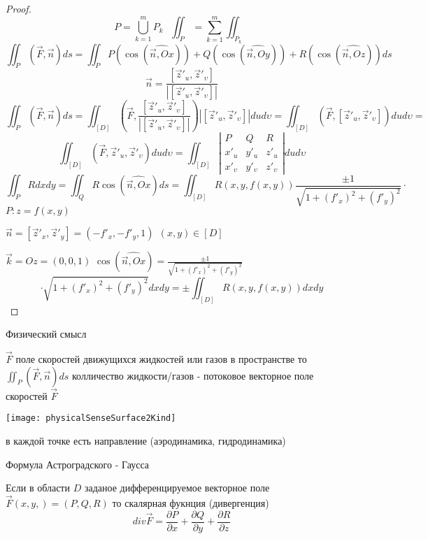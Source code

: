 \begin{proof}
  $$
  P = \bigcup_{k=1}^m P_k ~~~ \iint_P = \sum_{k=1}^m \iint_{P_k}
  $$
  $$
  \iint_P (\vec F, \vec n) ds = \iint_P
  P(\cos(\widehat{\vec n, Ox})) +
  Q(\cos(\widehat{\vec n, Oy})) +
  R(\cos(\widehat{\vec n, Oz}))ds
  $$
  $$
  \vec n = \frac{[\vec z'_u, \vec z'_{\upsilon}]}
  {|[\vec z'_u, \vec z'_{\upsilon}]|}
  $$
  $$
  \iint_P (\vec F, \vec n) ds = \iint_{[D]} \left( \vec F,
  \frac{[\vec z'_u, \vec z'_{\upsilon}]}
  {|[\vec z'_u, \vec z'_{\upsilon}]|} \right) |[\vec z'_u, \vec z'_{\upsilon}]|
  du d\upsilon = \iint_{[D]} (\vec F,[\vec z'_u, \vec z'_{\upsilon}])du
  d\upsilon =
  $$
  $$
  \iint_{[D]} (\vec F, \vec z'_u , \vec z'_{\upsilon}) du d\upsilon
  = \iint_{[D]}
  \left|
  \begin{array}{ccc}
    P & Q & R \\
    x'_u & y'_u & z'_u \\
    x'_{\upsilon} & y'_{\upsilon} & z'_{\upsilon}
  \end{array}
  \right| du d\upsilon
  $$
  $$
  \iint_P R dx dy = \iint_Q R \cos(\widehat{\vec n, Ox}) ds = \iint_{[D]}
  R(x,y,f(x,y)) \frac{\pm 1}{\sqrt{1 + (f'_x)^2 + (f'_y)^2}} \cdot
  $$
  $P: z = f(x,y)$

  $\vec n = [\vec z'_x, \vec z'_y] = (-f'_x, -f'_y, 1) ~~ (x,y) \in [D]$

  $\vec k = Oz = (0,0,1)$
  $\cos(\widehat{\vec n, Ox}) = \frac{\pm 1}{\sqrt{1 + (f'_x)^2 + (f'_y)^2}}$
  $$
  \cdot \sqrt{1 + (f'_x)^2 + (f'_y)^2} dx dy = \pm \iint_{[D]} R(x,y, f(x,y))
  dx dy
  $$
\end{proof}

\begin{title}[\Large]
  Физический смысл
\end{title}

$\vec F$ поле скоростей движущихся жидкостей или газов в пространстве то
$\iint_P (\vec F, \vec n) ds$ колличество жидкости/газов - потоковое векторное
поле скоростей $\vec F$

\texttt{[image: physicalSenseSurface2Kind]}

в каждой точке есть направление (аэродинамика, гидродинамика)

\begin{title}[\Large]
  Формула Астроградского - Гаусса
\end{title}

\begin{define}[дивергенции]
  Если в области $D$ заданое дифференцируемое векторное поле $\vec F(x,y,)
  = (P, Q, R)$ то скалярная фукнция (дивергенция)
  $$
  div \vec F = \frac{\partial P}{\partial x} + \frac{\partial Q}{\partial y}
  + \frac{\partial R}{\partial z}
  $$
\end{define}

